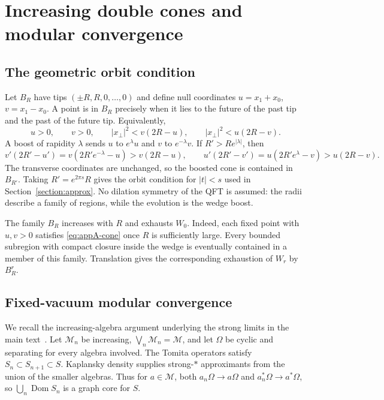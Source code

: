 \documentclass[a4paper,11pt]{article}
\theoremstyle{definition}
\begin{document}
\section{Increasing double cones and modular convergence}\label{app:increasing}

\subsection{The geometric orbit condition}\label{app:orbit}

Let $B_R$ have tips $(\pm R,R,0,\ldots,0)$ and define null coordinates $u=x_1+x_0$, $v=x_1-x_0$. A point is in $B_R$ precisely when it lies to the future of the past tip and the past of the future tip. Equivalently,
\begin{equation}
 u>0,\qquad v>0,\qquad |x_\perp|^2<v(2R-u),\qquad |x_\perp|^2<u(2R-v).
 \label{eq:appA-cone}
\end{equation}
A boost of rapidity $\lambda$ sends $u$ to $e^\lambda u$ and $v$ to $e^{-\lambda}v$. If $R'>Re^{|\lambda|}$, then
\begin{equation}
 v'(2R'-u')=v(2R'e^{-\lambda}-u)>v(2R-u),\qquad
 u'(2R'-v')=u(2R'e^{\lambda}-v)>u(2R-v).
 \label{eq:appA-boosted}
\end{equation}
The transverse coordinates are unchanged, so the boosted cone is contained in $B_{R'}$. Taking $R'=e^{2\pi s}R$ gives the orbit condition for $|t|<s$ used in Section~\ref{section:approx}. No dilation symmetry of the QFT is assumed: the radii describe a family of regions, while the evolution is the wedge boost.

The family $B_R$ increases with $R$ and exhausts $W_0$. Indeed, each fixed point with $u,v>0$ satisfies \eqref{eq:appA-cone} once $R$ is sufficiently large. Every bounded subregion with compact closure inside the wedge is eventually contained in a member of this family. Translation gives the corresponding exhaustion of $W_r$ by $B^r_R$.

\subsection{Fixed-vacuum modular convergence}\label{app:convergence}

We recall the increasing-algebra argument underlying the strong limits in the main text~\cite{revolutionizing,takesaki2}. Let $\mathcal M_n$ be increasing, $\bigvee_n\mathcal M_n=\mathcal M$, and let $\Omega$ be cyclic and separating for every algebra involved. The Tomita operators satisfy $S_n\subset S_{n+1}\subset S$. Kaplansky density supplies strong-$*$ approximants from the union of the smaller algebras. Thus for $a\in\mathcal M$, both $a_n\Omega\to a\Omega$ and $a_n^*\Omega\to a^*\Omega$, so $\bigcup_n\operatorname{Dom}S_n$ is a graph core for $S$.
\end{document}
